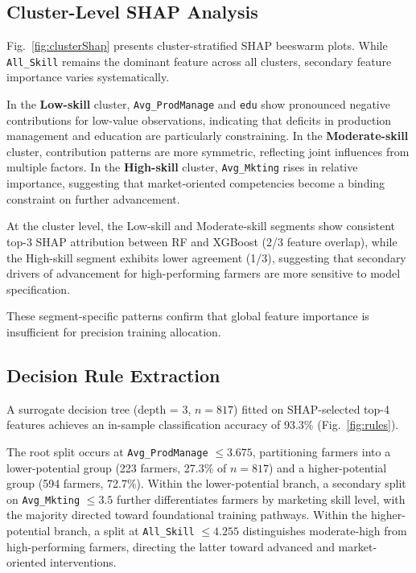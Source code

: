 \documentclass[3p,twocolumn,authoryear]{elsarticle}
\begin{document}
\subsection{Cluster-Level SHAP Analysis}

Fig.~\ref{fig:clusterShap} presents cluster-stratified SHAP beeswarm
plots.
While \texttt{All\_Skill} remains the dominant feature across all
clusters, secondary feature importance varies systematically.

In the \textbf{Low-skill} cluster, \texttt{Avg\_ProdManage} and
\texttt{edu} show pronounced negative contributions for low-value
observations, indicating that deficits in production management and
education are particularly constraining.
In the \textbf{Moderate-skill} cluster, contribution patterns are more
symmetric, reflecting joint influences from multiple factors.
In the \textbf{High-skill} cluster, \texttt{Avg\_Mkting} rises in
relative importance, suggesting that market-oriented competencies become
a binding constraint on further advancement.

At the cluster level, the Low-skill and Moderate-skill segments show
consistent top-3 SHAP attribution between RF and XGBoost (2/3 feature
overlap), while the High-skill segment exhibits lower agreement (1/3),
suggesting that secondary drivers of advancement for high-performing
farmers are more sensitive to model specification.

These segment-specific patterns confirm that global feature importance
is insufficient for precision training allocation.

\subsection{Decision Rule Extraction}

A surrogate decision tree (depth = 3, $n = 817$) fitted on
SHAP-selected top-4 features achieves an in-sample classification
accuracy of 93.3\% (Fig.~\ref{fig:rules}).

The root split occurs at \texttt{Avg\_ProdManage} $\leq 3.675$,
partitioning farmers into a lower-potential group
(223 farmers, 27.3\% of $n = 817$) and a higher-potential group
(594 farmers, 72.7\%).
Within the lower-potential branch, a secondary split on
\texttt{Avg\_Mkting} $\leq 3.5$ further differentiates farmers by
marketing skill level, with the majority directed toward foundational
training pathways.
Within the higher-potential branch, a split at
\texttt{All\_Skill} $\leq 4.255$ distinguishes moderate-high from
high-performing farmers, directing the latter toward advanced and
market-oriented interventions.
\end{document}
